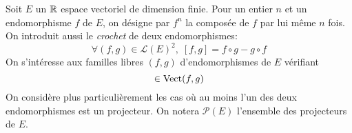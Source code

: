 Soit $E$ un $\mathbb{R}$ espace vectoriel de dimension finie. Pour un entier $n$ et un endomorphisme $f$ de $E$, on désigne par $f^{n}$ la composée de $f$ par lui même $n$ fois.\newline
On introduit aussi le \emph{crochet} de deux endomorphismes:
\begin{displaymath}
\forall (f,g)\in \mathcal{L}(E)^2,\;  [f,g] = f\circ g - g \circ f
\end{displaymath}
On s'intéresse aux familles libres $(f,g)$ d'endomorphismes de $E$ vérifiant 
\begin{displaymath}
  [f,g] \in \Vect(f,g)
\end{displaymath}
On considère plus particulièrement les cas où au moins l'un des deux endomorphismes est un projecteur. On notera $\mathcal{P}(E)$ l'ensemble des projecteurs de $E$.
